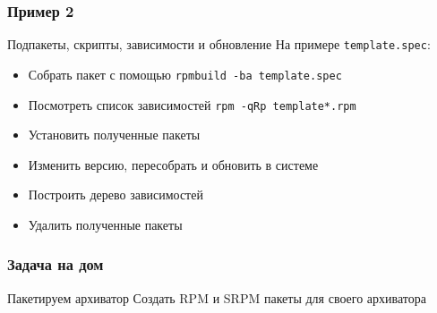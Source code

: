 \begin{frame}
	\frametitle{Пример 2}

	\begin{block}{Подпакеты, скрипты, зависимости и обновление}
		На примере {\tt template.spec}:

		\begin{itemize}
			\item Собрать пакет с помощью {\tt rpmbuild -ba template.spec}
			\item Посмотреть список зависимостей {\tt rpm -qRp template*.rpm}
			\item Установить полученные пакеты
			\item Изменить версию, пересобрать и обновить в системе
			\item Построить дерево зависимостей
			\item Удалить полученные пакеты
		\end{itemize}
	\end{block}
\end{frame}





\begin{frame}
	\frametitle{Задача на дом}

	\begin{block}{Пакетируем архиватор}
		Создать RPM и SRPM пакеты для своего архиватора
	\end{block}

\end{frame}
